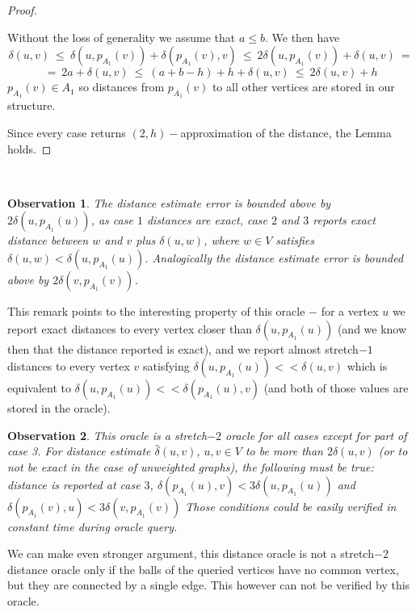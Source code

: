 \documentclass[shortabstract, lic, english]{iithesis}
\theoremstyle{definition} \newtheorem{definition}{Definition}[chapter]
\theoremstyle{plain} \newtheorem{remark}[definition]{Observation}
\theoremstyle{plain} \newtheorem{theorem}[definition]{Theorem}
\theoremstyle{plain} \newtheorem{lemma}[definition]{Lemma}
\theoremstyle{plain} \newtheorem{conjecture}[definition]{Conjecture}
\begin{document}
\begin{proof}
\begin{enumerate}
            Without the loss of generality we assume that $a \leq b$. We then have 
            $$\delta(u, v) ~\leq~ \delta(u, p_{A_1}(v)) + \delta(p_{A_1}(v), v) ~\leq~ 2\delta(u, p_{A_1}(v)) + \delta(u, v) ~=$$
            $$=~ 2a + \delta(u,v) ~\leq~ (a + b - h) + h + \delta(u,v) ~\leq~ 2\delta(u, v) + h$$
            $p_{A_1}(v) \in A_1$ so distances from $p_{A_1}(v)$ to all other vertices are stored in our structure.
    \end{enumerate}
    Since every case returns $(2,h)-$approximation of the distance, the Lemma holds.
\end{proof}

~

\begin{remark}
    The distance estimate error is bounded above by $2\delta(u, p_{A_1}(u))$,
    as case $1$ distances are exact, case $2$ and $3$ reports exact distance between $w$ and $v$ plus $\delta(u, w)$, where $w \in V$ satisfies $\delta(u, w) < \delta(u, p_{A_1}(u))$.
    Analogically the distance estimate error is bounded above by $2\delta(v, p_{A_1}(v))$.
\end{remark}

This remark points to the interesting property of this oracle $-$ for a vertex $u$ we report exact distances to every vertex closer than $\delta(u, p_{A_1}(u))$ (and we know then that the distance reported is exact),
and we report almost stretch$-1$ distances to every vertex $v$ satisfying $\delta(u, p_{A_1}(u)) << \delta(u, v)$ which is equivalent to $\delta(u, p_{A_1}(u)) << \delta(p_{A_1}(u), v)$ (and both of those values are stored in the oracle).

\begin{remark}
    This oracle is a stretch$-2$ oracle for all cases except for part of case 3.
    For distance estimate $\hat{\delta}(u, v)$, $u,v \in V$ to be more than $2\delta(u,v)$ (or to not be exact in the case of unweighted graphs),
    the following must be true: distance is reported at case $3$,
    $\delta(p_{A_1}(u), v) < 3\delta(u, p_{A_1}(u))$ and $\delta(p_{A_1}(v), u) < 3\delta(v, p_{A_1}(v))$
    Those conditions could be easily verified in constant time during oracle query.
\end{remark}

We can make even stronger argument, this distance oracle is not a stretch$-2$ distance oracle only if the balls of the queried vertices have no common vertex, but they are connected by a single edge.
This however can not be verified by this oracle.
\end{document}
